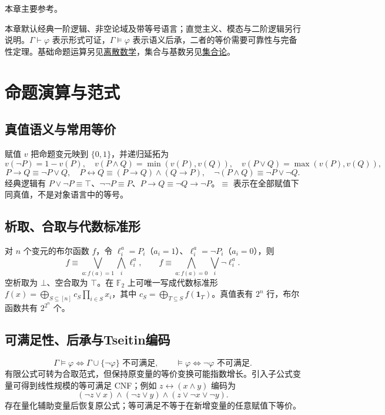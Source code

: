 \documentclass[../main.tex]{subfiles}
\begin{document}
本章主要参考\cite{freund}。

本章默认经典一阶逻辑、非空论域及带等号语言；直觉主义、模态与二阶逻辑另行说明。$\Gamma\vdash\varphi$ 表示形式可证，$\Gamma\models\varphi$ 表示语义后承，二者的等价需要可靠性与完备性定理。基础命题运算另见\hyperref[chap:discrete-mathematics]{离散数学}，集合与基数另见\hyperref[chap:set-theory]{集合论}。
\section{命题演算与范式}
\subsection{真值语义与常用等价}
赋值 $v$ 把命题变元映到 $\{0,1\}$，并递归延拓为
\[
v(\neg P)=1-v(P),\quad v(P\land Q)=\min(v(P),v(Q)),\quad
v(P\lor Q)=\max(v(P),v(Q)),
\]
\[
P\to Q\equiv\neg P\lor Q,\quad
P\leftrightarrow Q\equiv(P\to Q)\land(Q\to P),\quad
\neg(P\land Q)\equiv\neg P\lor\neg Q.
\]
经典逻辑有 $P\lor\neg P\equiv\top$、$\neg\neg P\equiv P$、$P\to Q\equiv\neg Q\to\neg P$。$\equiv$ 表示在全部赋值下同真值，不是对象语言中的等号。
\subsection{析取、合取与代数标准形}
对 $n$ 个变元的布尔函数 $f$，令 $\ell_i^a=P_i$（$a_i=1$）、$\ell_i^a=\neg P_i$（$a_i=0$），则
\[
f\equiv\bigvee_{a:f(a)=1}\bigwedge_i\ell_i^a,\qquad
f\equiv\bigwedge_{a:f(a)=0}\bigvee_i\neg\ell_i^a.
\]
空析取为 $\bot$、空合取为 $\top$。在 $\mathbb F_2$ 上可唯一写成代数标准形 $f(x)=\bigoplus_{S\subseteq[n]}c_S\prod_{i\in S}x_i$，其中 $c_S=\bigoplus_{T\subseteq S}f(\bm1_T)$。真值表有 $2^n$ 行，布尔函数共有 $2^{2^n}$ 个。
\subsection{可满足性、后承与Tseitin编码}
\[
\Gamma\models\varphi\iff\Gamma\cup\{\neg\varphi\}\text{ 不可满足},\qquad
\models\varphi\iff\neg\varphi\text{ 不可满足}.
\]
有限公式可转为合取范式，但保持原变量的等价变换可能指数增长。引入子公式变量可得到线性规模的等可满足 CNF；例如 $z\leftrightarrow(x\land y)$ 编码为
\[
(\neg z\lor x)\land(\neg z\lor y)\land(z\lor\neg x\lor\neg y).
\]
存在量化辅助变量后恢复原公式；等可满足不等于在新增变量的任意赋值下等价。
\end{document}
